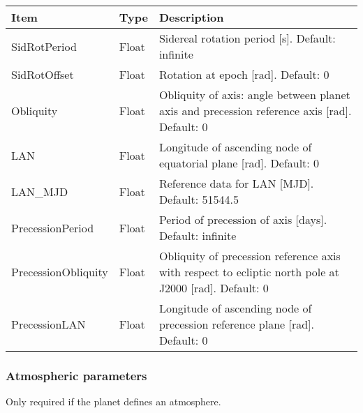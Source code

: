 \documentclass[Orbiter Developer Manual.tex]{subfiles}
\begin{document}
	\begin{longtable}{ |p{}|p{}|p{}| }
	\hline\rule{0pt}{2ex}
	\textbf{Item} & \textbf{Type} & \textbf{Description}\\
	\hline\rule{0pt}{2ex}
	SidRotPeriod & Float & Sidereal rotation period [s]. Default: infinite\\
	\hline\rule{0pt}{2ex}
	SidRotOffset & Float & Rotation at epoch [rad]. Default: 0\\
	\hline\rule{0pt}{2ex}
	Obliquity & Float & Obliquity of axis: angle between planet axis and precession reference axis [rad]. Default: 0\\
	\hline\rule{0pt}{2ex}
	LAN & Float & Longitude of ascending node of equatorial plane [rad]. Default: 0\\
	\hline\rule{0pt}{2ex}
	LAN\_MJD & Float & Reference data for LAN [MJD]. Default: 51544.5\\
	\hline\rule{0pt}{2ex}
	PrecessionPeriod & Float & Period of precession of axis [days]. Default: infinite\\
	\hline\rule{0pt}{2ex}
	PrecessionObliquity & Float & Obliquity of precession reference axis with respect to ecliptic north pole at J2000 [rad]. Default: 0\\
	\hline\rule{0pt}{2ex}
	PrecessionLAN & Float & Longitude of ascending node of precession reference plane [rad]. Default: 0\\
	\hline
	\end{longtable}


\subsubsection*{Atmospheric parameters}
Only required if the planet defines an atmosphere.
\end{document}
